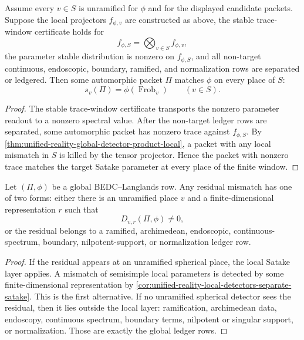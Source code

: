 \begin{theorem}
\label{thm:unified-reality-fixed-window-trace-local-satake}
Assume every $v\in S$ is unramified for $\phi$ and for the displayed
candidate packets. Suppose the local projectors $f_{\phi,v}$ are
constructed as above, the stable trace-window certificate holds for
$$
f_{\phi,S}=\bigotimes_{v\in S}f_{\phi,v},
$$
the parameter stable distribution is nonzero on $f_{\phi,S}$, and all
non-target continuous, endoscopic, boundary, ramified, and normalization
rows are separated or ledgered. Then some automorphic packet $\Pi$
matches $\phi$ on every place of $S$:
$$
s_v(\Pi)=\phi(\operatorname{Frob}_v)
\qquad(v\in S).
$$
\end{theorem}
\begin{proof}
The stable trace-window certificate transports the nonzero parameter
readout to a nonzero spectral value. After the non-target ledger rows
are separated, some automorphic packet has nonzero trace against
$f_{\phi,S}$. By
\autoref{thm:unified-reality-global-detector-product-local}, a packet
with any local mismatch in $S$ is killed by the tensor projector. Hence
the packet with nonzero trace matches the target Satake parameter at
every place of the finite window.
\end{proof}

\begin{theorem}
\label{thm:unified-reality-local-global-residual-dichotomy}
Let $(\Pi,\phi)$ be a global BEDC--Langlands row. Any residual mismatch
has one of two forms: either there is an unramified place $v$ and a
finite-dimensional representation $r$ such that
$$
D_{v,r}(\Pi,\phi)\ne0,
$$
or the residual belongs to a ramified, archimedean, endoscopic,
continuous-spectrum, boundary, nilpotent-support, or normalization
ledger row.
\end{theorem}
\begin{proof}
If the residual appears at an unramified spherical place, the local
Satake layer applies. A mismatch of semisimple local parameters is
detected by some finite-dimensional representation by
\autoref{cor:unified-reality-local-detectors-separate-satake}. This is
the first alternative. If no unramified spherical detector sees the
residual, then it lies outside the local layer: ramification,
archimedean data, endoscopy, continuous spectrum, boundary terms,
nilpotent or singular support, or normalization. Those are exactly the
global ledger rows.
\end{proof}

